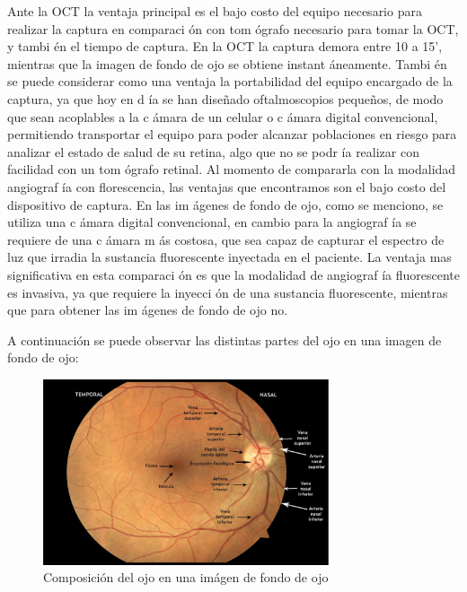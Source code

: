 Ante la OCT la ventaja principal es el bajo costo del equipo necesario para realizar la captura en comparaci \'on con tom \'ografo necesario para tomar la OCT, y tambi \'en el tiempo de captura. En la OCT la captura demora entre 10 a 15’, mientras que la imagen de fondo de ojo se obtiene instant \'aneamente. Tambi \'en se puede considerar como una ventaja la portabilidad del equipo encargado de la captura, ya que hoy en d \'ia se han diseñado oftalmoscopios pequeños, de modo que sean acoplables a la c \'amara de un celular o c \'amara digital convencional, permitiendo transportar el equipo para poder alcanzar poblaciones en riesgo para analizar el estado de salud de su retina, algo que no se podr \'ia realizar con facilidad con un tom \'ografo retinal.
Al momento de compararla con la modalidad angiograf \'ia con florescencia, las ventajas que encontramos son el bajo costo del dispositivo de captura. En las im \'agenes de fondo de ojo, como se menciono, se utiliza una c \'amara digital convencional, en cambio para la angiograf \'ia se requiere de una c \'amara m \'as costosa, que sea capaz de capturar el espectro de luz que irradia la sustancia fluorescente inyectada en el paciente. La ventaja mas significativa en esta comparaci \'on es que la modalidad de angiograf \'ia fluorescente es invasiva, ya que requiere la inyecci \'on de una sustancia fluorescente, mientras que para obtener las im \'agenes de fondo de ojo no.

A continuaci\'on se puede observar las distintas partes del ojo en una imagen de fondo de ojo:
\begin{figure}[H]
	{
	\centering
	\includegraphics[width=0.75\textwidth]{Figures/ComposicionOjoIFO}
	\caption[Glaucoma]{Composici\'on del ojo en una im\'agen de fondo de ojo}
	\label{fig:Composici\'on del ojo, observada en una im\'agen de fondo de ojo}
	}
\end{figure}

